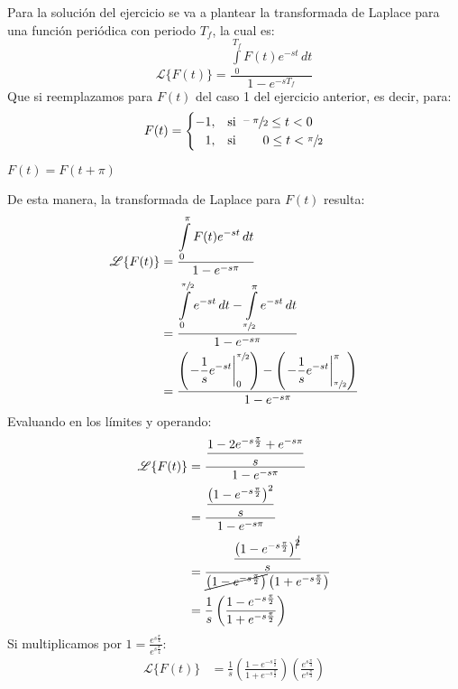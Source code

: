 \begin{multicols}{2}
Para la solución del ejercicio se va a plantear la transformada de Laplace para una función periódica con periodo $T_f$, la cual es:
\begin{equation}
    \mathscr{L}\{F(t)\} = \frac{\displaystyle\int\limits_{0}^{T_f} F(t) e^{-st} \,dt}{1-e^{-sT_f}} \label{pro6:eq1}
\end{equation}
Que si reemplazamos para $F(t)$ del caso 1 del ejercicio anterior, es decir, para:
\begin{equation*}
    F(t) =
    \begin{cases}
    -1,&\text{si } \sfrac{-\pi}{2} \leq t < 0\\
    \hphantom{-}1,&\text{si } \hspace{18pt} 0 \leq t < \sfrac{\pi}{2}
    \end{cases}
\end{equation*}
\begin{center}$F(t)=F(t+\pi)$\end{center}
De esta manera, la transformada de Laplace para $F(t)$ resulta:
\begin{align*}
    \mathscr{L} \{F(t)\} &= \frac{\displaystyle\int\limits_{0}^{\pi} F(t)e^{-st} \,dt}{1-e^{-s\pi}}\\
    &= \frac{\displaystyle\int\limits_{0}^{\sfrac{\pi}{2}} e^{-st} \,dt - \displaystyle\int\limits_{\sfrac{\pi}{2}}^{\pi} e^{-st} \,dt}{1-e^{-s\pi}}\\
    &= \frac{\left(\left.\displaystyle-\frac{1}{s}e^{-st}\right|_{0}^{\sfrac{\pi}{2}}\right)-\left(\left.\displaystyle-\frac{1}{s}e^{-st}\right|_{\sfrac{\pi}{2}}^{\pi}\right)}{1-e^{-s\pi}}
\end{align*}
Evaluando en los límites y operando:
\begin{align*}
    \mathscr{L} \{F(t)\} &= \frac{\displaystyle\frac{1 - 2e^{-s\frac{\pi}{2}} + e^{-s\pi}}{s}}{1-e^{-s\pi}}\\
    &= \frac{\displaystyle\frac{\left(1 - e^{-s\frac{\pi}{2}}\right)^{2}}{s}}{1-e^{-s\pi}}\\
    &= \frac{\displaystyle\frac{\left(1 - e^{-s\frac{\pi}{2}}\right)^{\cancel{2}}}{s}}{\cancel{\left(1-e^{-s\frac{\pi}{2}}\right)}\left(1+e^{-s\frac{\pi}{2}}\right)}\\
    &= \frac{1}{s} \left(\frac{1-e^{-s\frac{\pi}{2}}}{1+e^{-s\frac{\pi}{2}}}\right)
\end{align*}
Si multiplicamos por $1 = \frac{e^{s\frac{\pi}{4}}}{e^{s\frac{\pi}{4}}}$:
\begin{align*}
    \mathscr{L} \{F(t)\} &= \frac{1}{s} \left(\frac{1-e^{-s\frac{\pi}{2}}}{1+e^{-s\frac{\pi}{2}}}\right) \left(\frac{e^{s\frac{\pi}{4}}}{e^{s\frac{\pi}{4}}}\right)\\

\end{align*}
\end{multicols}
